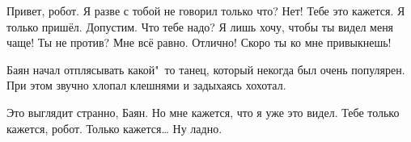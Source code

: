 \begin{dialog}
\X Привет, робот.
\R Я разве с тобой не говорил только что?
\X Нет! Тебе это кажется. Я только пришёл.
\R Допустим. Что тебе надо?
\X Я лишь хочу, чтобы ты видел меня чаще! Ты не против?
\R Мне всё равно.
\X Отлично! Скоро ты ко мне привыкнешь!
\end{dialog}

\begin{monolog}
Баян начал отплясывать какой"~то танец, который некогда был очень популярен. При этом звучно хлопал клешнями и задыхаясь хохотал.
\end{monolog}

\begin{dialog}
\X Это выглядит странно, Баян. Но мне кажется, что я уже это видел.
\R Тебе только кажется, робот. Только кажется…
\X Ну ладно.
\end{dialog}